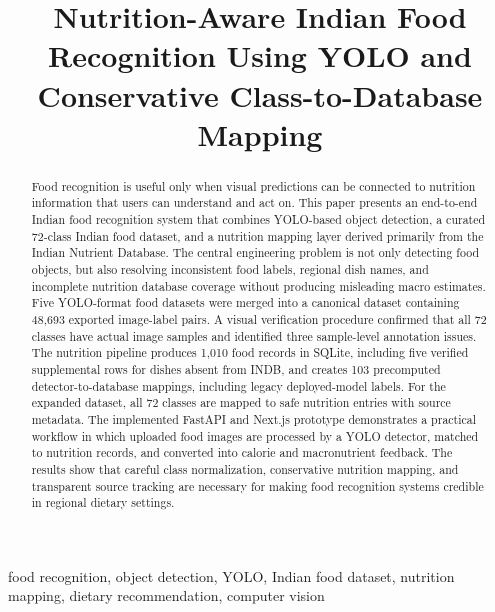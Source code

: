 \documentclass[conference]{IEEEtran}
\newcommand{\projecttitle}{Nutrition-Aware Indian Food Recognition Using YOLO and Conservative Class-to-Database Mapping}
\begin{document}
\title{\projecttitle}

\author{
}

\maketitle

\begin{abstract}
Food recognition is useful only when visual predictions can be connected to nutrition information that users can understand and act on. This paper presents an end-to-end Indian food recognition system that combines YOLO-based object detection, a curated 72-class Indian food dataset, and a nutrition mapping layer derived primarily from the Indian Nutrient Database. The central engineering problem is not only detecting food objects, but also resolving inconsistent food labels, regional dish names, and incomplete nutrition database coverage without producing misleading macro estimates. Five YOLO-format food datasets were merged into a canonical dataset containing 48,693 exported image-label pairs. A visual verification procedure confirmed that all 72 classes have actual image samples and identified three sample-level annotation issues. The nutrition pipeline produces 1,010 food records in SQLite, including five verified supplemental rows for dishes absent from INDB, and creates 103 precomputed detector-to-database mappings, including legacy deployed-model labels. For the expanded dataset, all 72 classes are mapped to safe nutrition entries with source metadata. The implemented FastAPI and Next.js prototype demonstrates a practical workflow in which uploaded food images are processed by a YOLO detector, matched to nutrition records, and converted into calorie and macronutrient feedback. The results show that careful class normalization, conservative nutrition mapping, and transparent source tracking are necessary for making food recognition systems credible in regional dietary settings.
\end{abstract}

\begin{IEEEkeywords}
food recognition, object detection, YOLO, Indian food dataset, nutrition mapping, dietary recommendation, computer vision
\end{IEEEkeywords}
\end{document}
